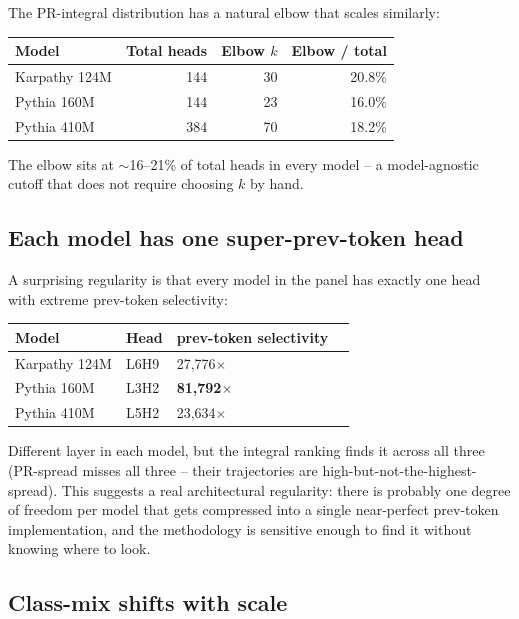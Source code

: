\documentclass[11pt]{article}
\begin{document}
The PR-integral distribution has a natural elbow that scales similarly:

\begin{center}
\small
\begin{tabular}{lrrr}
\toprule
Model & Total heads & Elbow $k$ & Elbow / total \\
\midrule
Karpathy 124M & 144 & 30 & 20.8\% \\
Pythia 160M   & 144 & 23 & 16.0\% \\
Pythia 410M   & 384 & 70 & 18.2\% \\
\bottomrule
\end{tabular}
\end{center}

The elbow sits at $\sim$16--21\% of total heads in every model -- a model-agnostic cutoff that does not require choosing $k$ by hand.

\subsection{Each model has one super-prev-token head}
\label{sec:super_prev}

A surprising regularity is that every model in the panel has exactly one head with extreme prev-token selectivity:

\begin{center}
\small
\begin{tabular}{lll r}
\toprule
Model & Head & prev-token selectivity \\
\midrule
Karpathy 124M & L6H9 & 27{,}776$\times$ \\
Pythia 160M   & L3H2 & \textbf{81{,}792}$\times$ \\
Pythia 410M   & L5H2 & 23{,}634$\times$ \\
\bottomrule
\end{tabular}
\end{center}

Different layer in each model, but the integral ranking finds it across all three (PR-spread misses all three -- their trajectories are high-but-not-the-highest-spread). This suggests a real architectural regularity: there is probably one degree of freedom per model that gets compressed into a single near-perfect prev-token implementation, and the methodology is sensitive enough to find it without knowing where to look.

\subsection{Class-mix shifts with scale}
\end{document}
